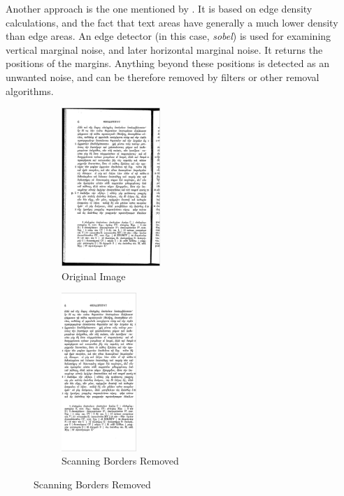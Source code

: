 Another approach is the one mentioned by \citet{marginalNoiseEdge}. It is based on edge density calculations, and the fact that text areas have generally a much lower density than edge areas. An edge detector (in this case, \emph{sobel}) is used for examining vertical marginal noise, and later horizontal marginal noise. It returns the positions of the margins. Anything beyond these positions is detected as an unwanted noise, and can be therefore removed by filters or other removal algorithms.

\begin{figure}[H]
\hspace*{\fill} %
\begin{subfigure}{0.31\textwidth}
\includegraphics[width=\linewidth,height=60mm]{img/scan_borders_orig.png}
\caption{Original Image} \label{fig:1a}
\end{subfigure}
\hspace*{\fill} %
\begin{subfigure}{0.31\textwidth}
\includegraphics[width=\linewidth,height=60mm]{img/scan_borders_result.png}
\caption{Scanning Borders Removed} \label{fig:1b}
\end{subfigure}
\hspace*{\fill} %
\end{figure}


